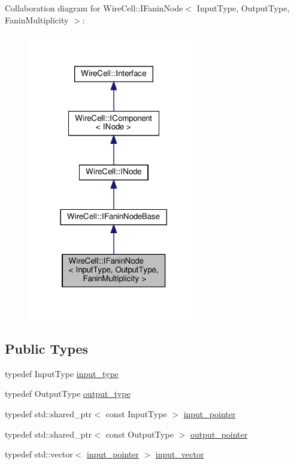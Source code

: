 Collaboration diagram for Wire\+Cell\+:\+:I\+Fanin\+Node$<$ Input\+Type, Output\+Type, Fanin\+Multiplicity $>$\+:
\nopagebreak
\begin{figure}[H]
\begin{center}
\leavevmode
\includegraphics[width=213pt]{class_wire_cell_1_1_i_fanin_node__coll__graph}
\end{center}
\end{figure}
\subsection*{Public Types}
\begin{DoxyCompactItemize}
\item 
typedef Input\+Type \hyperlink{class_wire_cell_1_1_i_fanin_node_ac47c1dc3929cef7fb2ff2412eaf984a1}{input\+\_\+type}
\item 
typedef Output\+Type \hyperlink{class_wire_cell_1_1_i_fanin_node_ab0058a83fd6ff641a73f24d4fa7bbd9d}{output\+\_\+type}
\item 
typedef std\+::shared\+\_\+ptr$<$ const Input\+Type $>$ \hyperlink{class_wire_cell_1_1_i_fanin_node_ae4f0134fe2d798f865d358b24ab0ba9c}{input\+\_\+pointer}
\item 
typedef std\+::shared\+\_\+ptr$<$ const Output\+Type $>$ \hyperlink{class_wire_cell_1_1_i_fanin_node_a748d9cd1916dda1cb12c3376b229f906}{output\+\_\+pointer}
\item 
typedef std\+::vector$<$ \hyperlink{class_wire_cell_1_1_i_fanin_node_ae4f0134fe2d798f865d358b24ab0ba9c}{input\+\_\+pointer} $>$ \hyperlink{class_wire_cell_1_1_i_fanin_node_aec26233b8b7756c5a42280a5db47ffda}{input\+\_\+vector}
\end{DoxyCompactItemize}
